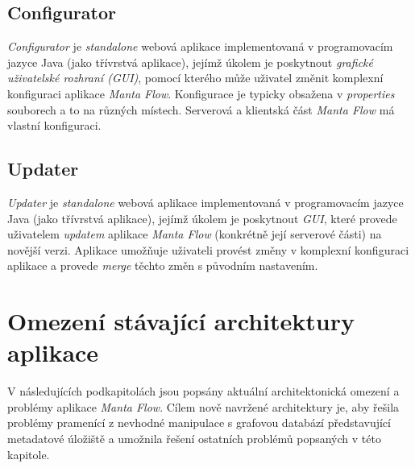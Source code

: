 \subsection{Configurator}
\label{sec:ana_configurator}
\textit{Configurator} je \textit{standalone} webová aplikace implementovaná v programovacím jazyce Java (jako třívrstvá aplikace), jejímž úkolem je poskytnout \textit{grafické uživatelské rozhraní (GUI)}, pomocí kterého může uživatel změnit komplexní konfiguraci aplikace \textit{Manta Flow}. Konfigurace je typicky obsažena v \textit{properties} souborech a to na různých místech. Serverová a klientská část \textit{Manta Flow} má vlastní konfiguraci. \cite{Molitor18}

\subsection{Updater}
\label{sec:ana_updater}
\textit{Updater} je \textit{standalone} webová aplikace implementovaná v programovacím jazyce Java (jako třívrstvá aplikace), jejímž úkolem je poskytnout \textit{GUI}, které provede uživatelem \textit{updatem} aplikace \textit{Manta Flow} (konkrétně její serverové části) na novější verzi. Aplikace umožňuje uživateli provést změny v komplexní konfiguraci aplikace a provede \textit{merge} těchto změn s původním nastavením. \cite{Gondek16}

\section{Omezení stávající architektury aplikace}
\label{sec:ana_problems}
V následujících podkapitolách jsou popsány aktuální architektonická omezení a problémy aplikace \textit{Manta Flow}. Cílem nově navržené architektury je, aby řešila problémy pramenící z nevhodné manipulace s grafovou databází představující metadatové úložiště a umožnila řešení ostatních problémů popsaných v této kapitole.

